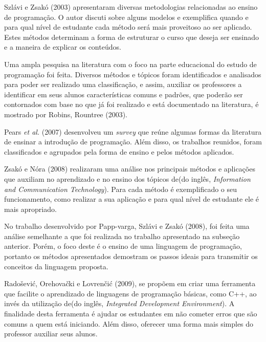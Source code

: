 \nocite{methods}
Szlávi e Zsakó (2003) apresentaram diversas metodologias relacionadas ao ensino de programação. O autor discuti sobre alguns modelos e exemplifica quando e para qual nível de estudante cada método será mais proveitoso ao ser aplicado. Estes métodos determinam a forma de estruturar o curso que deseja ser ensinado e a maneira de explicar os conteúdos.

\nocite{doi:10.1076/csed.13.2.137.14200} 
Uma ampla pesquisa na literatura com o foco na parte educacional do estudo de programação foi feita. Diversos métodos e tópicos foram identificados e analisados para poder ser realizado uma classificação, e assim, auxiliar os professores a identificar em seus alunos características comuns e padrões, que poderão ser contornados com base no que já foi realizado e está documentado na literatura, é mostrado por Robins, Rountree (2003).

\nocite{Pears:2007:SLT:1345443.1345441}
Pears \textit{et al.} (2007) desenvolveu um \textit{survey} que reúne algumas formas da literatura de ensinar a introdução de programação. Além disso, os trabalhos reunidos, foram classificados e agrupados pela forma de ensino e pelos métodos aplicados.


\nocite{teachingapplications} 
Zsakó e Nóra (2008) realizaram uma análise nos principais métodos e aplicações que auxiliam no aprendizado e no ensino dos tópicos de(do inglês, \textit{Information and Communication Technology}). Para cada método é exemplificado o seu funcionamento, como realizar a sua aplicação e para qual nível de estudante ele é mais apropriado. 


\nocite{teachingapplicationslanguages} 
No trabalho desenvolvido por Papp-varga, Szlávi e Zsakó (2008), foi feita uma análise semelhante a que foi realizada no trabalho apresentado na subseção anterior. Porém, o foco deste é o ensino de uma linguagem de programação, portanto os métodos apresentados demostram os passos ideais para transmitir os conceitos da linguagem proposta.

\nocite{newapproach} 
Radošević, Orehovački e Lovrenčić (2009), se propõem em criar uma ferramenta que facilite o aprendizado de linguagens de programação básicas, como C++, ao invés da utilização de(do inglês, \textit{Integrated Development Environment}). A finalidade desta ferramenta é ajudar os estudantes em não cometer erros que são comuns a quem está iniciando. Além disso, oferecer uma forma mais simples do professor auxiliar seus alunos.

